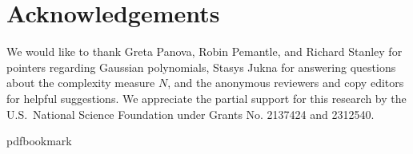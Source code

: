 \documentclass[11pt]{article}
\numberwithin{equation}{section}
\theoremstyle{definition}
\theoremstyle{plain}
\begin{document}
\section*{Acknowledgements}

We would like to thank Greta Panova, Robin Pemantle, and Richard Stanley for pointers regarding Gaussian polynomials, Stasys Jukna for answering questions about the complexity measure $N$, and the anonymous reviewers and copy editors for helpful suggestions. 
%
We appreciate the partial support for this research by the U.S.\ National Science Foundation under Grants No. 2137424 and 2312540. 
%
%


\newcommand{\prelim}{Preliminary version in\ }\newcommand{\prelims}{Preliminary
  versions in\ }
\providecommand{\bibhead}[1]{}
\expandafter\ifx\csname pdfbookmark\endcsname\relax%
  \providecommand{\tocrefpdfbookmark}{}
\else\providecommand{\tocrefpdfbookmark}{%
   \hypertarget{tocreferences}{}%
   \pdfbookmark[1]{References}{tocreferences}}%
\fi
\end{document}
